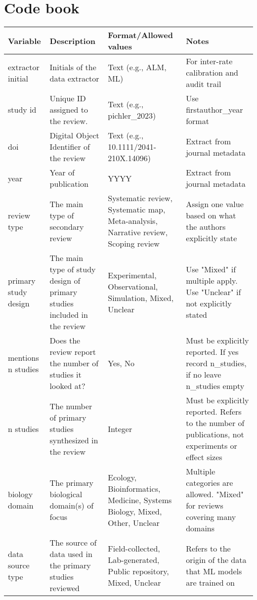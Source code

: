 \documentclass{article}
\begin{document}
\section{Code book}
    \begin{longtable}{p{1.5cm}p{3cm}p{3cm}p{3cm}}
        \hline
         \textbf{Variable} & \textbf{Description} & \textbf{Format/Allowed values} & \textbf{Notes}\\
         \hline
        extractor initial & Initials of the data extractor & Text (e.g., ALM, ML) & For inter-rate calibration and audit trail\\
        study id & Unique ID assigned to the review. & Text (e.g., pichler\_2023) & Use firstauthor\_year format\\
        doi & Digital Object Identifier of the review & Text (e.g., 10.1111/2041-210X.14096) & Extract from journal metadata\\
        year & Year of publication & YYYY & Extract from journal metadata\\
        review type & The main type of secondary review & Systematic review, Systematic map, Meta-analysis, Narrative review, Scoping review & Assign one value based on what the authors explicitly state\\
        primary study design & The main type of study design of primary studies included in the review & Experimental, Observational, Simulation, Mixed, Unclear & Use "Mixed" if multiple apply. Use "Unclear" if not explicitly stated\\
        mentions n studies & Does the review report the number of studies it looked at? & Yes, No & Must be explicitly reported. If yes record n\_studies, if no leave n\_studies empty\\
        n studies & The number of primary studies synthesized in the review & Integer & Must be explicitly reported. Refers to the number of publications, not experiments or effect sizes\\
        biology domain & The primary biological domain(s) of focus & Ecology, Bioinformatics, Medicine, Systems Biology, Mixed, Other, Unclear & Multiple categories are allowed. "Mixed" for reviews covering many domains\\
        data source type & The source of data used in the primary studies reviewed & Field-collected, Lab-generated, Public repository, Mixed, Unclear & Refers to the origin of the data that ML models are trained on\\

\end{longtable}
\end{document}
